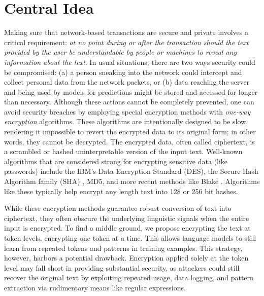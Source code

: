 \documentclass[letterpaper]{article} %
\begin{document}
\section{Central Idea}
\label{ref:central_idea}
Making sure that network-based transactions are secure and private involves a critical requirement: \emph{at no point during or after the transaction should the text provided by the user be understandable by people or machines to reveal any information about the text}. In usual situations, there are two ways security could be compromised: (a) a person sneaking into the network could intercept and collect personal data from the network packets, or (b) data reaching the server and being used by models for predictions might be stored and accessed for longer than necessary. Although these actions cannot be completely prevented, one can avoid security breaches by employing special encryption methods with \emph{one-way encryption} algorithms. These algorithms are intentionally designed to be slow, rendering it impossible to revert the encrypted data to its original form; in other words, they cannot be decrypted. The encrypted data, often called ciphertext, is a scrambled or hashed uninterpretable version of the input text. Well-known algorithms that are considered strong for encrypting sensitive data (like passwords) include the IBM's Data Encryption Standard (DES), the Secure Hash Algorithm family (SHA) \cite{penard2008secure}, MD5, and more recent methods like Blake \cite{blake2}. Algorithms like these typically help encrypt any length text into 128 or 256 bit hashes.

While these encryption methods guarantee robust conversion of text into ciphertext, they often obscure the underlying linguistic signals when the entire input is encrypted. To find a middle ground, we propose encrypting the text at token levels, encrypting one token at a time. This allows language models to still learn from repeated tokens and patterns in training examples. This strategy, however, harbors a potential drawback. Encryption applied solely at the token level may fall short in providing substantial security, as attackers could still recover the original text by exploiting repeated usage, data logging, and pattern extraction via rudimentary means like regular expressions.
\end{document}
